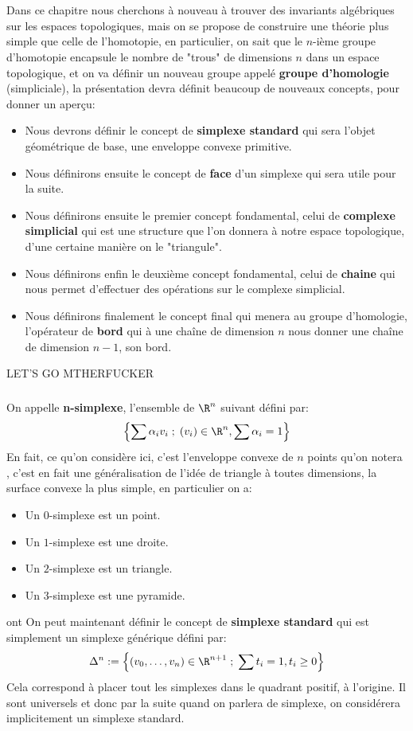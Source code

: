\documentclass{report}
\begin{document}
\chapter*{}
Dans ce chapitre nous cherchons à nouveau à trouver des invariants algébriques sur les espaces topologiques, mais on se propose de construire une théorie plus simple que celle de l'homotopie, en particulier, on sait que le \(n\)-ième groupe d'homotopie encapsule le nombre de "trous" de dimensions \(n\) dans un espace topologique, et on va définir un nouveau groupe appelé \textbf{groupe d'homologie} (simpliciale), la présentation devra définit beaucoup de nouveaux concepts, pour donner un aperçu:
\begin{itemize}
   \item Nous devrons définir le concept de \textbf{simplexe standard} qui sera l'objet géométrique de base, une enveloppe convexe primitive.
   \item Nous définirons ensuite le concept de \textbf{face} d'un simplexe qui sera utile pour la suite.
   \item Nous définirons ensuite le premier concept fondamental, celui de \textbf{complexe simplicial} qui est une structure que l'on donnera à notre espace topologique, d'une certaine manière on le "triangule".
   \item Nous définirons enfin le deuxième concept fondamental, celui de \textbf{chaine} qui nous permet d'effectuer des opérations sur le complexe simplicial.
   \item Nous définirons finalement le concept final qui menera au groupe d'homologie, l'opérateur de \textbf{bord} qui à une chaîne de dimension \(n\) nous donner une chaîne de dimension \(n-1\), son bord.
\end{itemize}
LET'S GO MTHERFUCKER
\subsection*{}
On appelle \textbf{n-simplexe}, l'ensemble de \(\R^n\) suivant défini par:
\[
   \Bigl\{ \sum\alpha_iv_i\; ; \; (v_i) \in \R^n, \sum\alpha_i = 1 \Bigl\}
\]
En fait, ce qu'on considère ici, c'est l'enveloppe convexe de \(n\) points qu'on notera \(\), c'est en fait une généralisation de l'idée de triangle à toutes dimensions, la surface convexe la plus simple, en particulier on a:
\begin{itemize}
   \item Un \(0\)-simplexe est un point.
   \item Un \(1\)-simplexe est une droite.
   \item Un \(2\)-simplexe est un triangle.
   \item Un \(3\)-simplexe est une pyramide.
\end{itemize}ont 
On peut maintenant définir le concept de \textbf{simplexe standard} qui est simplement un simplexe générique défini par:
\[
   \Delta^n := \Bigl\{(v_0, \ldots, v_n) \in \R^{n+1} \; ; \; \sum t_i = 1, t_i \geq 0\Bigl\}
\]
Cela correspond à placer tout les simplexes dans le quadrant positif, à l'origine. Il sont universels et donc par la suite quand on parlera de simplexe, on considérera implicitement un simplexe standard.
\end{document}
